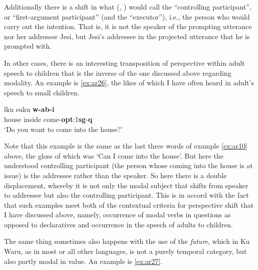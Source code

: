 \documentclass[output=paper]{langsci/langscibook}
\begin{document}
Additionally there is a shift in what \citeauthor{Nuyts2005} (\citeyear{Nuyts2005}, \citeyear{Nuyts2006}) would call the “controlling participant”, or “first-argument participant” (and \citealt{Lehmann2012} the “executor”), i.e., the person who would carry out the intention. That is, it is not the speaker of the prompting utterance nor her addressee Jesi, but Jesi’s addressee in the projected utterance that he is prompted with.

In other cases, there is an interesting transposition of perspective within adult speech to children that is the inverse of the one discussed above regarding modality. An example is \ref{ex:ar26}, the likes of which I have often heard in adult’s speech to small children.

\begin{exe}
	\ex \label{ex:ar26}
	\gll lku suku \textbf{w-ab-i}\\
	house inside come-\textbf{opt}:1\textbf{sg}-\textbf{q}\\
	\trans ‘Do you want to come into the house?’
\end{exe}

Note that this example is the same as the last three words of example \ref{ex:ar10} above, the gloss of which was ‘Can I come into the house’.  But here the understood controlling participant (the person whose coming into the house is at issue) is the addressee rather than the speaker. So here there is a double displacement, whereby it is not only the modal subject that shifts from speaker to addressee but also the controlling participant. This is in accord with the fact that such examples meet both of the contextual criteria for perspective shift that I have discussed above, namely, occurrence of modal verbs in questions as opposed to declaratives and occurrence in the speech of adults to children.

The same thing sometimes also happens with the use of the \textit{future}, which in Ku Waru, as in most or all other languages, is not a purely temporal category, but also partly modal in value. An example is \ref{ex:ar27}.
\end{document}
